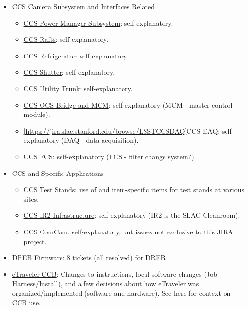 \begin{itemize}
	\item CCS Camera Subsystem and Interfaces Related
		\begin{itemize}
		\item \href{https://jira.slac.stanford.edu/browse/LSSTCCSPOWER}{CCS Power Manager Subsystem}:  self-explanatory.
		\item \href{https://jira.slac.stanford.edu/browse/LSSTCCSRAFTS}{CCS Rafts}:  self-explanatory.
		\item \href{https://jira.slac.stanford.edu/browse/LSSTCCSREFRIG}{CCS Refrigerator}:  self-explanatory.
		\item \href{https://jira.slac.stanford.edu/browse/LSSTCCSSHUTTER}{CCS Shutter}:  self-explanatory.
		\item \href{https://jira.slac.stanford.edu/browse/LSSTCCSUT}{CCS Utility Trunk}:  self-explanatory.
		\item \href{https://jira.slac.stanford.edu/browse/LCOBM}{CCS OCS Bridge and MCM}:  self-explanatory (MCM - master control module).
		\item \ref{https://jira.slac.stanford.edu/browse/LSSTCCSDAQ}{CCS DAQ}:  self-explanatory (DAQ - data acquisition).
		\item \href{https://jira.slac.stanford.edu/browse/LSSTCCSFCS}{CCS FCS}:  self-explanatory (FCS - filter change system?).	
	\end{itemize}
	\item CCS and Specific Applications
	\begin{itemize}
		\item \href{https://jira.slac.stanford.edu/browse/LSSTCCSTS}{CCS Test Stands}:  use of and item-specific items for test stands at various sites.
		\item \href{https://jira.slac.stanford.edu/browse/LSSTIR}{CCS IR2 Infrastructure}:  self-explanatory (IR2 is the SLAC Cleanroom).
		\item \href{https://jira.slac.stanford.edu/browse/LSSTCCSCOM}{CCS ComCam}:  self-explanatory, but issues not exclusive to this JIRA project.
	\end{itemize}
	\item \href{https://jira.slac.stanford.edu/browse/LSSTDREB}{DREB Firmware}:  8 tickets (all resolved) for DREB.
	\item \href{https://jira.slac.stanford.edu/browse/ETCCB}{eTraveler CCB}:  Changes to instructions, local software changes (Job Harness/Install), and a few decisions about how eTraveler was organized/implemented (software and hardware). See here for context on CCB use.
\end{itemize}


